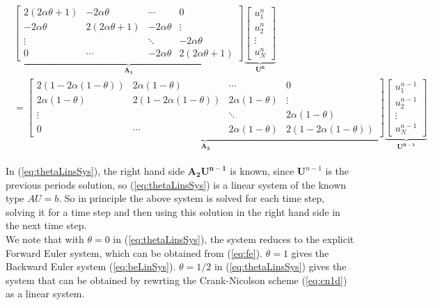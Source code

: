 \documentclass{article}
\begin{document}
\begin{subequations}
	\begin{align}
		\begin{split}
		\underbrace{\begin{bmatrix} 2(2 \alpha \theta + 1) & - 2\alpha \theta & \cdots & 0 \\ - 2\alpha \theta & 2(2 \alpha \theta + 1) & - 2\alpha \theta & \vdots \\
			\vdots & &  \ddots & - 2\alpha \theta \\ 
			0 & \cdots & - 2\alpha \theta &2(2 \alpha \theta + 1) \end{bmatrix}}_{\mathbf{A_1}} 
		\underbrace{\begin{bmatrix} u_1^n\\ u_2^n \\ \vdots\\ u_N^n \end{bmatrix}}_{\mathbf{U^{n}}}\\ = 
		\underbrace{\begin{bmatrix} 2( 1 - 2 \alpha (1-\theta)) &  2\alpha (1-\theta) & \cdots & 0 \\  2\alpha (1-\theta) & 2( 1 - 2 \alpha (1-\theta)) &  2\alpha (1-\theta) & \vdots \\
	\vdots & &  \ddots &  2\alpha (1-\theta) \\ 
	0 & \cdots &  2\alpha (1-\theta) &2( 1 - 2 \alpha (1-\theta)) \end{bmatrix}}_{\mathbf{A_2}} 
	\underbrace{\begin{bmatrix} u_1^{n-1}\\ u_2^{n-1} \\ \vdots\\ u_N^{n-1} \end{bmatrix}}_{\mathbf{U^{n-1}}}	
		\end{split}\label{eq:thetaLinsSys}
	\end{align}
\end{subequations}

In (\ref{eq:thetaLinsSys}), the right hand side $\mathbf{A_2 U^{n-1}}$ is known, since $\mathbf{U}^{n-1}$ is the previous periods solution, so (\ref{eq:thetaLinsSys}) is a linear system of the known type $A U = b$. So in principle the above system is solved for each time step, solving it for a time step and then using this solution in the right hand side in the next time step.\\

We note that with $\theta = 0$ in (\ref{eq:thetaLinsSys}), the system reduces to the explicit Forward Euler system, which can be obtained from (\ref{eq:fe}). $\theta  = 1$ gives the Backward Euler system (\ref{eq:beLinSys}). $\theta = 1/2$ in (\ref{eq:thetaLinsSys}) gives the system that can be obtained by rewrting the Crank-Nicolson scheme (\ref{eq:cn1d}) as a linear system.\\
\end{document}
